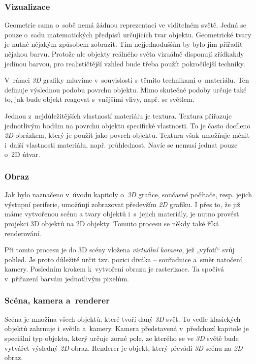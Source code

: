 \documentclass[a4paper,12pt]{article}
\begin{document}
\subsubsection{Vizualizace}

Geometrie sama o~sobě nemá žádnou reprezentaci ve viditelném světě. Jedná se pouze o~sadu matematických předpisů určujících tvar objektu. Geometrické tvary je nutné nějakým způsobem zobrazit. Tím nejjednodušším by bylo jim přiřadit nějakou barvu. Protože ale objekty reálného světa vizuálně disponují zřídkakdy jedinou barvou, pro realističtější vzhled bude třeba použít pokročilejší techniky.~\cite{graphic}

V~rámci \textit{3D} grafiky mluvíme v~souvislosti s~těmito technikami o~materiálu. Ten definuje výslednou podobu povrchu objektu. Mimo skutečné podoby určuje také to, jak bude objekt reagovat s~vnějšími vlivy, např. se světlem.~\cite{graphic}

Jednou z~nejdůležitějších vlastností materiálu je textura. Textura přiřazuje jednotlivým bodům na povrchu objektu specifické vlastnosti. To je často docíleno \textit{2D} obrázkem, který je použit jako povrch objektu. Textura však umožňuje měnit i~další vlastnosti materiálu, např. průhlednost. Navíc se nemusí jednat pouze o~2D útvar.~\cite{graphic}

\subsubsection{Obraz}

Jak bylo naznačeno v~úvodu kapitoly o~\textit{3D} grafice, současné počítače, resp. jejich výstupní periferie, umožňují zobrazovat především \textit{2D} grafiku. I přes to, že již máme vytvořenou scénu a tvary objektů i~s~jejich materiály, je nutno provést projekci 3D objektů na 2D objekty. Tomuto procesu se někdy také říká renderování.~\cite{graphic}

Při tomto procesu je do 3D scény vložena \textit{virtuální kamera}, jež „vyfotí“ svůj pohled. Je proto důležité určit tzv. pozici diváka -- souřadnice a~směr natočení kamery. Posledním krokem k~vytvoření obrazu je rasterizace. Ta spočívá v~přiřazení barvám jednotlivým pixelům.~\cite{graphic}

\subsubsection{Scéna, kamera a~renderer}

Scéna je množina všech objektů, které tvoří daný \textit{3D} svět. To vedle klasických objektů zahrnuje i~světla a~kamery. Kamera představená v~předchozí kapitole je speciální typ objektu, který určuje zorné pole, ze kterého se ve \textit{3D} světě bude vytvářet výsledný \textit{2D} obraz. Renderer je objekt, který převádí \textit{3D} scénu na \textit{2D} obraz.~\cite{graphic}
\end{document}
